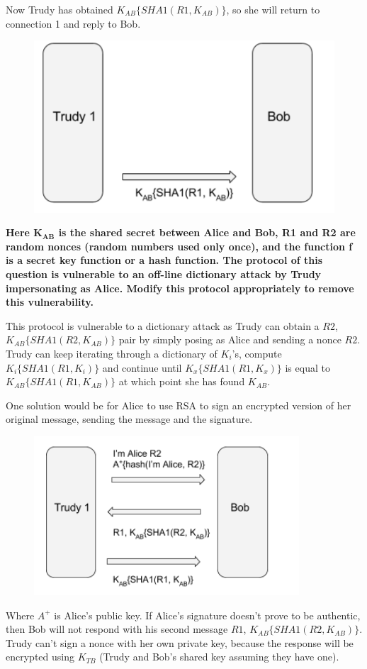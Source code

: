 \documentclass[11pt]{article}
\begin{document}
Now Trudy has obtained $K_{AB}\{SHA1(R1, K_{AB})\}$, so she will return to connection 1 and reply to Bob.

\begin{figure}[H]
  \centerline{\includegraphics[width=0.5\linewidth]{3h_4.png}}
\end{figure}


\textbf{Here $\mathbf{K_{AB}}$ is the shared secret between Alice and Bob, R1 and R2 are random nonces (random numbers used only once), and the function f is a secret key function or a hash function. The protocol of this question is vulnerable to an off-line dictionary attack by Trudy impersonating as Alice. Modify this protocol appropriately to remove this vulnerability.}

This protocol is vulnerable to a dictionary attack as Trudy can obtain a $R2$, $K_{AB}\{SHA1(R2, K_{AB})\}$ pair by simply posing as Alice and sending a nonce $R2$. Trudy can keep iterating through a dictionary of $K_i$'s, compute $K_{i}\{SHA1(R1, K_{i})\}$ and continue until $K_{x}\{SHA1(R1, K_{x})\}$ is equal to $K_{AB}\{SHA1(R1, K_{AB})\}$ at which point she has found $K_{AB}$.

One solution would be for Alice to use RSA to sign an encrypted version of her original message, sending the message and the signature.

\begin{figure}[H]
  \centerline{\includegraphics[width=0.5\linewidth]{3h_5.png}}
\end{figure}

Where $A^+$ is Alice's public key. If Alice's signature doesn't prove to be authentic, then Bob will not respond with his second message $R1$, $K_{AB}\{SHA1(R2, K_{AB})\}$. Trudy can't sign a nonce with her own private key, because the response will be encrypted using $K_{TB}$ (Trudy and Bob's shared key assuming they have one).
\end{document}
